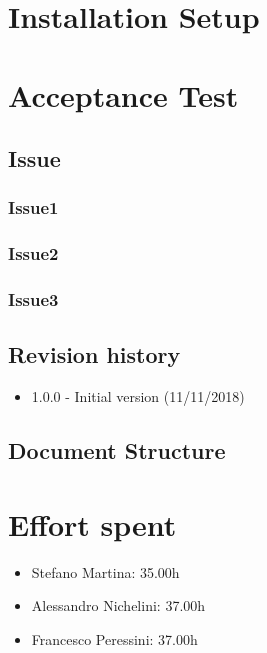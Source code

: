 \documentclass{article}
\begin{document}
\section{Installation Setup}
\section{Acceptance Test}
\subsection{Issue}
\subsubsection{Issue1}
\subsubsection{Issue2}
\subsubsection{Issue3}


\subsection{Revision history}
\begin{itemize}
	\item 1.0.0 - Initial version (11/11/2018)

\end{itemize}
\subsection{Document Structure}

\newpage










\newpage
\section{Effort spent}

\begin{itemize}
	\item Stefano Martina: 35.00h
	\item Alessandro Nichelini: 37.00h
	\item Francesco Peressini: 37.00h
\end{itemize}
\end{document}
